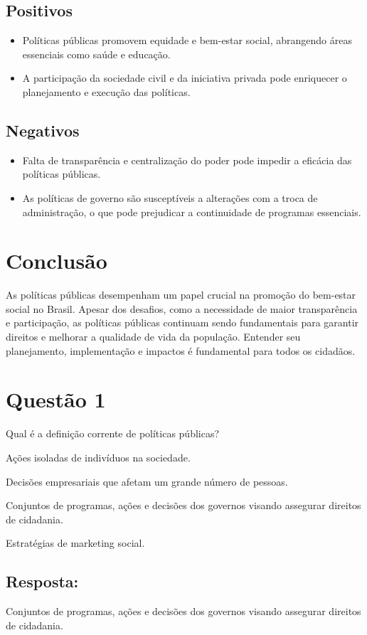 \documentclass[
   article,       
   12pt,          
   oneside,       
   a4paper,       
   english,       
   brazil,        
   sumario=tradicional
   ]{abntex2}
\begin{document}
\subsection{Positivos}
\begin{itemize}
    \item Políticas públicas promovem equidade e bem-estar social, abrangendo áreas essenciais como saúde e educação.
    \item A participação da sociedade civil e da iniciativa privada pode enriquecer o planejamento e execução das políticas.
\end{itemize}
\subsection{Negativos}
\begin{itemize}
    \item Falta de transparência e centralização do poder pode impedir a eficácia das políticas públicas.
    \item As políticas de governo são susceptíveis a alterações com a troca de administração, o que pode prejudicar a continuidade de programas essenciais.
\end{itemize}
\section{Conclusão}
As políticas públicas desempenham um papel crucial na promoção do bem-estar social no Brasil. Apesar dos desafios, como a necessidade de maior transparência e participação, as políticas públicas continuam sendo fundamentais para garantir direitos e melhorar a qualidade de vida da população. Entender seu planejamento, implementação e impactos é fundamental para todos os cidadãos.
\section{Questão 1}
Qual é a definição corrente de políticas públicas?
\itemize
    \item Ações isoladas de indivíduos na sociedade.
    \item Decisões empresariais que afetam um grande número de pessoas.
    \item Conjuntos de programas, ações e decisões dos governos visando assegurar direitos de cidadania.
    \item Estratégias de marketing social.
\subsection{Resposta:}
Conjuntos de programas, ações e decisões dos governos visando assegurar direitos de cidadania.
\end{document}
